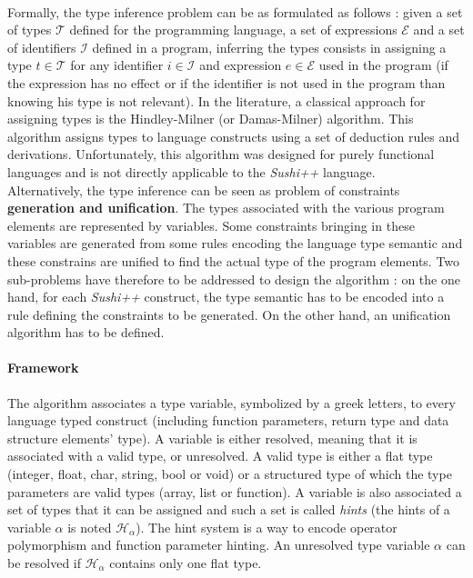 \documentclass[a4paper,11pt]{article}
\begin{document}
\paragraph{}
Formally, the type inference problem can be as formulated as follows : given a set of types $\mathcal{T}$ defined for the programming language, a set of expressions $\mathcal{E}$ and a set of identifiers $\mathcal{I}$ defined in a program, inferring the types consists in assigning a type $t \in \mathcal{T}$ for any identifier $i \in \mathcal{I}$ and expression $e \in \mathcal{E}$ used in the program (if the expression has no effect or if the identifier is not used in the program than knowing his type is not relevant). In the literature, a classical approach for assigning types is the Hindley-Milner (or Damas-Milner) algorithm. This algorithm assigns types to language constructs using a set of deduction rules and derivations. Unfortunately, this algorithm was designed for purely functional languages and is not directly applicable to the \textit{Sushi++} language. \\
Alternatively, the type inference can be seen as problem of constraints \textbf{generation and unification}. The types associated with the various program elements are represented by variables. Some constraints bringing in these variables are generated from some rules encoding the language type semantic and these constrains are unified to find the actual type of the program elements. Two sub-problems have therefore to be addressed to design the algorithm : on the one hand, for each \textit{Sushi++} construct, the type semantic has to be encoded into a rule defining the constraints to be generated. On the other hand, an unification algorithm has to be defined.
\paragraph{Framework} The algorithm associates a type variable, symbolized by a greek letters, to every language typed construct (including function parameters, return type and data structure elements' type). A variable is either resolved, meaning that it is associated with a valid type, or unresolved. A valid type is either a flat type (integer, float, char, string, bool or void) or a structured type of which the type parameters are valid types (array, list or function). A variable is also associated a set of types that it can be assigned and such a set is called \textit{hints} (the hints of a variable $\alpha$ is noted $\mathcal{H}_\alpha$). The hint system is a way to encode operator polymorphism and function parameter hinting. An unresolved type variable $\alpha$ can be resolved if $\mathcal{H}_\alpha$ contains only one flat type.
\end{document}
